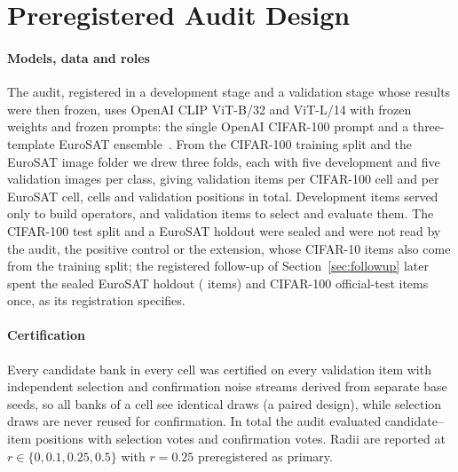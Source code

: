 \section{Preregistered Audit Design}
\label{sec:design}

\paragraph{Models, data and roles}
The audit, registered in a development stage and a validation stage whose
results were then frozen, uses OpenAI CLIP ViT-B/32 and ViT-L/14 with frozen weights and
frozen prompts: the single OpenAI CIFAR-100 prompt and a three-template EuroSAT
ensemble~\cite{radford2021clip,krizhevsky2009cifar,helber2019eurosat}. From the
CIFAR-100 training split and the EuroSAT image folder we drew three folds, each
with five development and five validation images per class, giving
\ExpCifarItemsPerCell{} validation items per CIFAR-100 cell and
\ExpEurosatItemsPerCell{} per EuroSAT cell, \ExpCells{} cells and
\ExpPositions{} validation positions in total. Development items served only to
build operators, and validation items to select and evaluate them. The
CIFAR-100 test split and a EuroSAT holdout were sealed and were not read by the
audit, the positive control or the extension, whose CIFAR-10 items also come
from the training split; the
registered follow-up of Section~\ref{sec:followup} later spent the sealed
EuroSAT holdout (\FUItemsEurosatB{} items) and \FUItemsCifarB{} CIFAR-100
official-test items once, as its registration specifies.

\paragraph{Certification}
Every candidate bank in every cell was certified on every validation item with
independent selection and confirmation noise streams derived from separate base
seeds, so all \ExpCandidates{} banks of a cell see identical draws (a paired
design), while selection draws are never reused for confirmation. In total the
audit evaluated \ExpRows{} candidate--item positions with \ExpSelVotes{}
selection votes and \ExpConfVotes{} confirmation votes. Radii are reported at
$r\in\{0,0.1,0.25,0.5\}$ with $r=0.25$ preregistered as primary.

